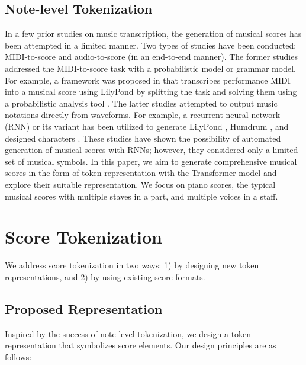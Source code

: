 \documentclass[sigconf]{acmart} %
\begin{document}
\subsection{Note-level Tokenization}
In a few prior studies on music transcription, the generation of musical scores has been attempted in a limited manner. Two types of studies have been conducted: MIDI-to-score and audio-to-score (in an end-to-end manner). The former studies \cite{Cogliati2016, Foscarin2019} addressed the MIDI-to-score task with a probabilistic model or grammar model. For example, a framework was proposed in \cite{Cogliati2016} that transcribes performance MIDI into a musical score using LilyPond \cite{Nienhuys2003} by splitting the task and solving them using a probabilistic analysis tool \cite{Temperley2009}. The latter studies \cite{Carvalho2017, Liu2021, Roman2018, Roman2019} attempted to output music notations directly from waveforms. For example, a recurrent neural network (RNN) or its variant has been utilized to generate LilyPond \cite{Carvalho2017, Liu2021}, Humdrum \cite{Roman2019}, and designed characters \cite{Roman2018}. These studies have shown the possibility of automated generation of musical scores with RNNs; however, they considered only a limited set of musical symbols. In this paper, we aim to generate comprehensive musical scores in the form of token representation with the Transformer model and explore their suitable representation. We focus on piano scores, the typical musical scores with multiple staves in a part, and multiple voices in a staff. 

\section{Score Tokenization}
\label{sec:3}
We address score tokenization in two ways: 1) by designing new token representations, and 2) by using existing score formats.

\subsection{Proposed Representation}
Inspired by the success of note-level tokenization, we design a token representation that symbolizes score elements. Our design principles are as follows:
\end{document}
